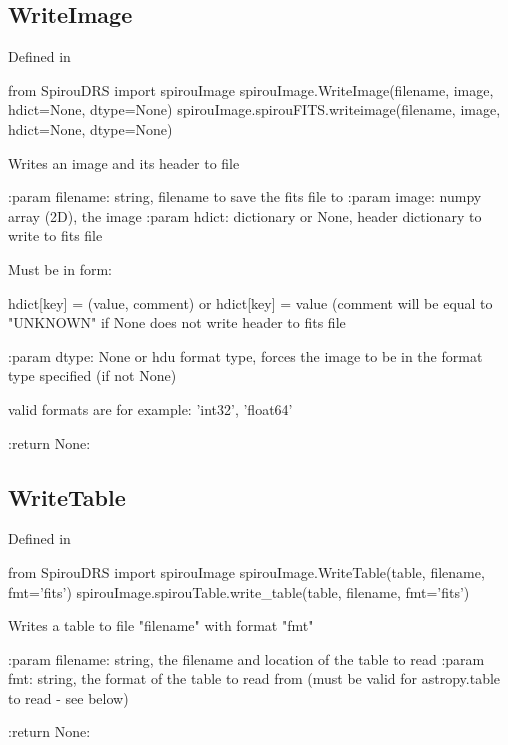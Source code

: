 \noindent\begin{minipage}{\textwidth}
\subsection{WriteImage}

Defined in \spirouImage{}

\begin{pythonbox}
from SpirouDRS import spirouImage
spirouImage.WriteImage(filename, image, hdict=None, dtype=None)
spirouImage.spirouFITS.writeimage(filename, image, hdict=None, dtype=None)
\end{pythonbox}

\begin{pythondocstring}
Writes an image and its header to file

:param filename: string, filename to save the fits file to
:param image: numpy array (2D), the image
:param hdict: dictionary or None, header dictionary to write to fits file

            Must be in form:

                    hdict[key] = (value, comment)
            or
                    hdict[key] = value     (comment will be equal to
                                            "UNKNOWN"
            if None does not write header to fits file                      
                            
:param dtype: None or hdu format type, forces the image to be in the
              format type specified (if not None)

              valid formats are for example: 'int32', 'float64'

:return None:
\end{pythondocstring}
\end{minipage}


\noindent\begin{minipage}{\textwidth}
\subsection{WriteTable}

Defined in \spirouImage{}

\begin{pythonbox}
from SpirouDRS import spirouImage
spirouImage.WriteTable(table, filename, fmt='fits')
spirouImage.spirouTable.write_table(table, filename, fmt='fits')
\end{pythonbox}

\begin{pythondocstring}
Writes a table to file "filename" with format "fmt"

:param filename: string, the filename and location of the table to read
:param fmt: string, the format of the table to read from (must be valid
            for astropy.table to read - see below)

:return None:
\end{pythondocstring}
\end{minipage}



